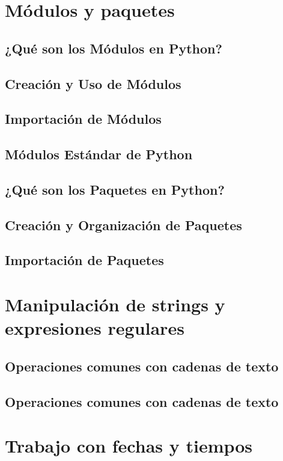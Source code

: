 \documentclass{article}
\begin{document}
\section{Módulos y paquetes}

\subsection{¿Qué son los Módulos en Python?}
\subsection{Creación y Uso de Módulos}
\subsection{Importación de Módulos}
\subsection{Módulos Estándar de Python}
\subsection{¿Qué son los Paquetes en Python?}
\subsection{Creación y Organización de Paquetes}
\subsection{Importación de Paquetes}

\section{Manipulación de strings y expresiones regulares}

\subsection{Operaciones comunes con cadenas de texto}
\subsection{Operaciones comunes con cadenas de texto}

\section{Trabajo con fechas y tiempos}
\end{document}
